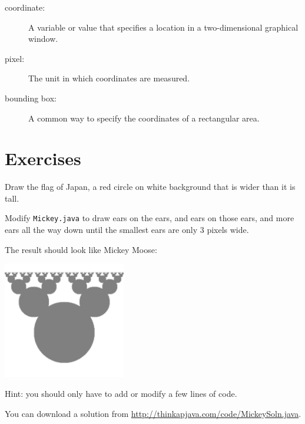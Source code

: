 \begin{description}

\item[coordinate:]  A variable or value that specifies a location
in a two-dimensional graphical window.

\item[pixel:]  The unit in which coordinates are measured.

\item[bounding box:]  A common way to specify the coordinates of
a rectangular area.


\end{description}


\section{Exercises}

\begin{exercise}
Draw the flag of Japan, a red circle on white background
that is wider than it is tall.
\end{exercise}


\begin{exercise}
Modify {\tt Mickey.java} to draw ears on the ears, and ears on those
ears, and more ears all the way down until the smallest ears are
only 3 pixels wide.

The result should look like Mickey Moose:

\includegraphics[height=2in]{figs/moose.pdf}

Hint: you should only have to add or modify a few lines of code.

You can download a solution from
\url{http://thinkapjava.com/code/MickeySoln.java}.

\end{exercise}


